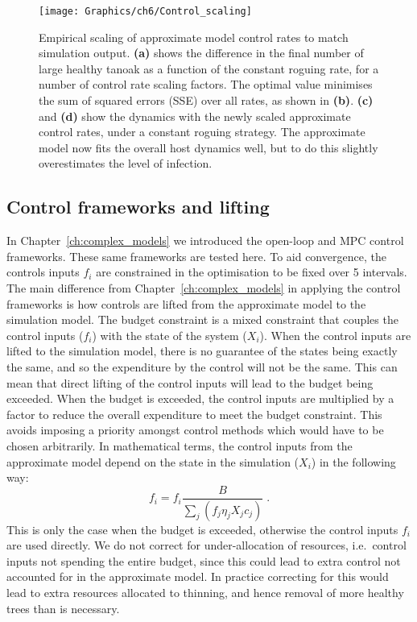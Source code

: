 \begin{figure}[t!]
    \begin{center}
        \texttt{[image: Graphics/ch6/Control\_scaling]}
        \caption[Scaling of control rates]{Empirical scaling of approximate model control rates to match simulation output. \textbf{(a)} shows the difference in the final number of large healthy tanoak as a function of the constant roguing rate, for a number of control rate scaling factors. The optimal value minimises the sum of squared errors (SSE) over all rates, as shown in \textbf{(b)}. \textbf{(c)} and \textbf{(d)} show the dynamics with the newly scaled approximate control rates, under a constant roguing strategy. The approximate model now fits the overall host dynamics well, but to do this slightly overestimates the level of infection.\label{fig:ch6:control_scaling}}
    \end{center}
\end{figure}

\subsection{Control frameworks and lifting}\label{sec:ch6:lifting}

In Chapter~\ref{ch:complex_models} we introduced the open-loop and MPC control frameworks. These same frameworks are tested here. To aid convergence, the controls inputs $f_i$ are constrained in the optimisation to be fixed over \SI{5}{\year} intervals. The main difference from Chapter~\ref{ch:complex_models} in applying the control frameworks is how controls are lifted from the approximate model to the simulation model. The budget constraint is a mixed constraint that couples the control inputs ($f_i$) with the state of the system ($X_i$). When the control inputs are lifted to the simulation model, there is no guarantee of the states being exactly the same, and so the expenditure by the control will not be the same. This can mean that direct lifting of the control inputs will lead to the budget being exceeded. When the budget is exceeded, the control inputs are multiplied by a factor to reduce the overall expenditure to meet the budget constraint. This avoids imposing a priority amongst control methods which would have to be chosen arbitrarily. In mathematical terms, the control inputs from the approximate model depend on the state in the simulation ($X_i$) in the following way:
\begin{equation}
    f_i = f_i\frac{B}{\sum_j\left(f_j\eta_jX_jc_j\right)}\;.
\end{equation}
This is only the case when the budget is exceeded, otherwise the control inputs $f_i$ are used directly. We do not correct for under-allocation of resources, i.e.\ control inputs not spending the entire budget, since this could lead to extra control not accounted for in the approximate model. In practice correcting for this would lead to extra resources allocated to thinning, and hence removal of more healthy trees than is necessary.

